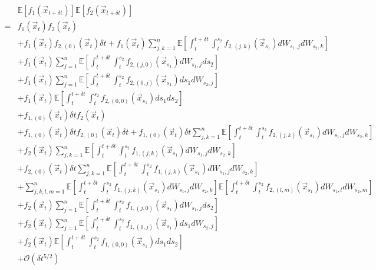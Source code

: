 \documentclass[12pt]{article}
\begin{document}
\begin{equation}
\begin{aligned}
&\mathbb{E} [f_1(\vec{x}_{t+\delta t})] \mathbb{E} [f_2(\vec{x}_{t+\delta t})] \\
=&
f_1(\vec{x}_t) f_2(\vec{x}_t) \\
&+  f_1(\vec{x}_t)f_{2,(0)}(\vec{x}_t) \delta t
+ f_1(\vec{x}_t)\sum_{j, k=1}^n \mathbb{E} \left[ \int_t^{t+\delta t} \int_t^{s_2} f_{2,(j,k)}(\vec{x}_{s_1}) dW_{s_1, j} dW_{s_2, k} \right] \\
&+ f_1(\vec{x}_t)\sum_{j=1}^n \mathbb{E} \left[ \int_t^{t+\delta t} \int_t^{s_2} f_{2,(j,0)}(\vec{x}_{s_1}) dW_{s_1, j} ds_2  \right]\\
&+ f_1(\vec{x}_t) \sum_{j=1}^n \mathbb{E} \left[ \int_t^{t+\delta t} \int_t^{s_2} f_{2,(0,j)}(\vec{x}_{s_1}) ds_1 dW_{s_2, j} \right] \\
&+ f_1(\vec{x}_t) \mathbb{E} \left[ \int_t^{t+\delta t} \int_t^{s_2} f_{2,(0,0)}(\vec{x}_{s_1}) ds_1 ds_2  \right]\\
&+ f_{1,(0)}(\vec{x}_t) \delta t f_2(\vec{x}_t) \\
&+ f_{1,(0)}(\vec{x}_t) \delta t f_{2,(0)}(\vec{x}_t) \delta t
+ f_{1,(0)}(\vec{x}_t) \delta t \sum_{j, k=1}^n \mathbb{E} \left[ \int_t^{t+\delta t} \int_t^{s_2} f_{2,(j,k)}(\vec{x}_{s_1}) dW_{s_1, j} dW_{s_2, k} \right] \\
&+ f_2(\vec{x}_t) \sum_{j, k=1}^n \mathbb{E} \left[ \int_t^{t+\delta t} \int_t^{s_2} f_{1,(j,k)}(\vec{x}_{s_1}) dW_{s_1, j} dW_{s_2, k} \right] \\
&+ f_{2,(0)}(\vec{x}_t) \delta t \sum_{j, k=1}^n \mathbb{E} \left[ \int_t^{t+\delta t} \int_t^{s_2} f_{1,(j,k)}(\vec{x}_{s_1}) dW_{s_1, j} dW_{s_2, k} \right] \\
&+ \sum_{j, k, l, m =1}^n \mathbb{E} \left[ \int_t^{t+\delta t} \int_t^{s_2} f_{1,(j,k)}(\vec{x}_{s_1}) dW_{s_1, j} dW_{s_2, k} \right] \mathbb{E} \left[ \int_t^{t+\delta t} \int_t^{s_2} f_{2,(l,m)}(\vec{x}_{s_1}) dW_{s_1, l} dW_{s_2, m} \right] \\
&+ f_2(\vec{x}_t) \sum_{j=1}^n \mathbb{E} \left[ \int_t^{t+\delta t} \int_t^{s_2} f_{1,(j,0)}(\vec{x}_{s_1}) dW_{s_1, j} ds_2  \right]  \\
&+ f_2(\vec{x}_t) \sum_{j=1}^n \mathbb{E} \left[  \int_t^{t+\delta t} \int_t^{s_2} f_{1,(0,j)}(\vec{x}_{s_1}) ds_1 dW_{s_2, j} \right] \\
&+ f_2(\vec{x}_t )\mathbb{E} \left[ \int_t^{t+\delta t} \int_t^{s_2} f_{1,(0,0)}(\vec{x}_{s_1}) ds_1 ds_2  \right]\\
&+ \mathcal{O}(\delta t^{5/2})
\end{aligned}
\end{equation}
\end{document}
